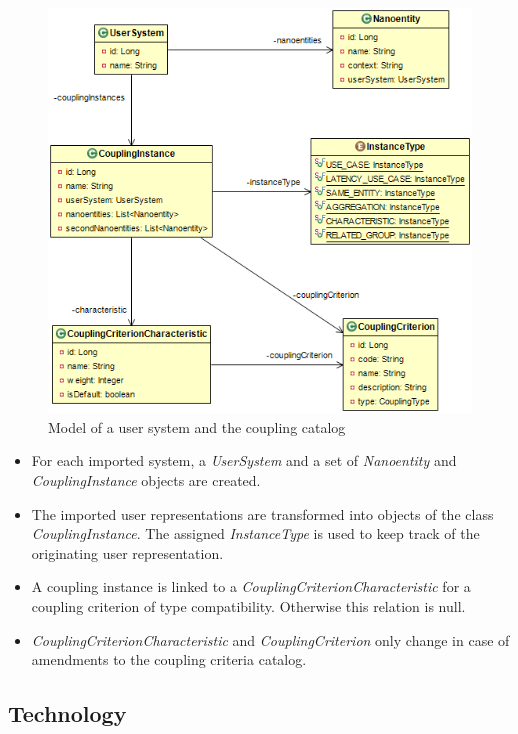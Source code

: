 \begin{figure}[H]
	\begin{center}
		\includegraphics[scale=0.5]{diagrams/CouplingCriterion.png}
		\caption{Model of a user system and the coupling catalog}
		\label{fig:datamodel}
	\end{center}
\end{figure}

\begin{itemize}
\item For each imported system, a \textit{UserSystem} and a set of \textit{Nanoentity} and \textit{CouplingInstance} objects are created.
\item The imported user representations are transformed into objects of the class \textit{CouplingInstance}. The assigned \textit{InstanceType} is used to keep track of the originating user representation.
\item A coupling instance is linked to a \textit{CouplingCriterionCharacteristic} for a coupling criterion of type compatibility. Otherwise this relation is null.
\item \textit{CouplingCriterionCharacteristic} and \textit{CouplingCriterion} only change in case of amendments to the coupling criteria catalog.
\end{itemize}

\subsection{Technology}
\label{subsec:technology}

